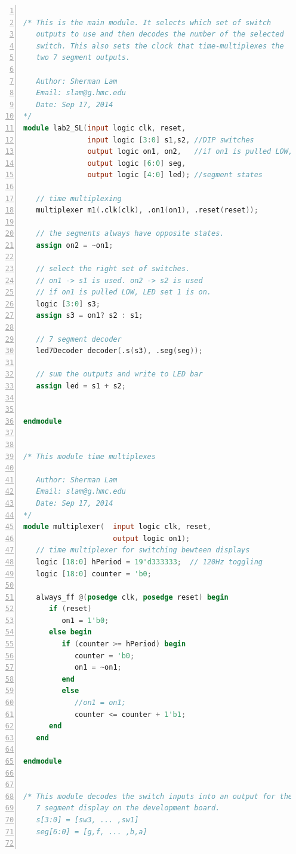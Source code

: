 \documentclass[11pt]{article}
\begin{document}
\begin{lstlisting}[language=Verilog,numbers=left,basicstyle=\footnotesize]

/* This is the main module. It selects which set of switch
   outputs to use and then decodes the number of the selected
   switch. This also sets the clock that time-multiplexes the 
   two 7 segment outputs.
   
   Author: Sherman Lam
   Email: slam@g.hmc.edu
   Date: Sep 17, 2014
*/
module lab2_SL(input logic clk, reset,
               input logic [3:0] s1,s2, //DIP switches
               output logic on1, on2,   //if on1 is pulled LOW, LED set 1 is on.
               output logic [6:0] seg,
               output logic [4:0] led); //segment states    
   
   // time multiplexing
   multiplexer m1(.clk(clk), .on1(on1), .reset(reset));
   
   // the segments always have opposite states.
   assign on2 = ~on1;      
   
   // select the right set of switches.
   // on1 -> s1 is used. on2 -> s2 is used
   // if on1 is pulled LOW, LED set 1 is on.
   logic [3:0] s3;
   assign s3 = on1? s2 : s1;  
   
   // 7 segment decoder
   led7Decoder decoder(.s(s3), .seg(seg));
   
   // sum the outputs and write to LED bar
   assign led = s1 + s2;
   
   
endmodule


/* This module time multiplexes

   Author: Sherman Lam
   Email: slam@g.hmc.edu
   Date: Sep 17, 2014
*/
module multiplexer(  input logic clk, reset,
                     output logic on1);
   // time multiplexer for switching bewteen displays
   logic [18:0] hPeriod = 19'd333333;  // 120Hz toggling
   logic [18:0] counter = 'b0;
      
   always_ff @(posedge clk, posedge reset) begin
      if (reset)     
         on1 = 1'b0;
      else begin
         if (counter >= hPeriod) begin
            counter = 'b0;
            on1 = ~on1;
         end
         else
            //on1 = on1;
            counter <= counter + 1'b1;
      end
   end
   
endmodule


/* This module decodes the switch inputs into an output for the 
   7 segment display on the development board.
   s[3:0] = [sw3, ... ,sw1]
   seg[6:0] = [g,f, ... ,b,a]
   

\end{lstlisting}
\end{document}
